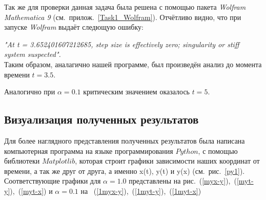 \documentclass[a4paper,14pt]{article}
\begin{document}
Так же для проверки данная задача была решена с помощью пакета {\it Wolfram Mathematica 9} (см.~прилож.~\ref{Task1_Wolfram}). Отчётливо видно, что при запуске {\it Wolfram} выдаёт следющую ошибку:

 {\it "At t = 3.652401607212685, step size is effectively zero; singularity or stiff system suspected".}\\
Таким образом, аналагично нашей программе, был произведён анализ до момента времени $t = 3.5$.

Аналогично при $\alpha = 0.1$ критическим значением оказалось $t = 5$.
\subsection{Визуализация полученных результатов}
Для более наглядного представления полученных результатов была написана компьютерная программа на языке программирования $Python$, с помощью библиотеки $Matplotlib$, которая строит графики зависимости наших координат от времени, а так же друг от друга, а именно x(t), y(t) и y(x) (см.~рис.~\ref{py1}). 
Соответствующие графики для $\alpha = 1.0$ представлены на рис.~(\ref{myx-y}),~(\ref{myt-y}),~(\ref{myt-x}) и $\alpha = 0.1$ на ~(\ref{1myx-y}),~(\ref{1myt-y}),~(\ref{1myt-x})
\end{document}
